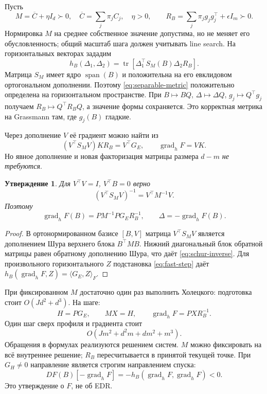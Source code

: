 \documentclass[11pt,a4paper]{article}
\newcommand{\tr}{\operatorname{tr}}
\newcommand{\spn}{\operatorname{span}}
\newcommand{\grad}{\operatorname{grad}}
\newcommand{\inner}[2]{\langle#1,#2\rangle_F}
\newtheorem{proposition}[theorem]{Утверждение}
\theoremstyle{remark}
\begin{document}
Пусть
\begin{equation}\label{eq:separable}
 M=\overline C+\eta I_d\succ0,\quad
 \overline C=\sum_j\pi_jC_j,\quad \eta>0,\qquad
 R_B=\sum_j\pi_jg_jg_j^\top+\epsilon I_m\succ0.
\end{equation}
Нормировка $M$ на среднее собственное значение допустима, но не меняет
его обусловленность; общий масштаб шага должен учитывать line search.
На горизонтальных векторах зададим
\begin{equation}\label{eq:separable-metric}
 h_B(\Delta_1,\Delta_2)
 =\tr[\Delta_1^\top S_M(B)\Delta_2R_B].
\end{equation}
Матрица $S_M$ имеет ядро $\spn(B)$ и положительна на его евклидовом
ортогональном дополнении. Поэтому \eqref{eq:separable-metric}
положительно определена на горизонтальном пространстве.
При $B\mapsto BQ$, $\Delta\mapsto\Delta Q$, $g_j\mapsto Q^\top g_j$
получаем $R_B\mapsto Q^\top R_BQ$, а значение формы сохраняется.
Это корректная метрика на Grassmann там, где $g_j(B)$ гладкие.

Через дополнение $V$ её градиент можно найти из
\[
 (V^\top S_MV)KR_B=V^\top G_E,\qquad \grad_hF=VK.
\]
Но явное дополнение и новая факторизация матрицы размера $d-m$
\emph{не требуются}.
\begin{proposition}\label{prop:inverse}
Для $V^\top V=I$, $V^\top B=0$ верно
\begin{equation}\label{eq:schur-inverse}
 (V^\top S_MV)^{-1}=V^\top M^{-1}V.
\end{equation}
Поэтому
\begin{equation}\label{eq:fast-step}
 \boxed{\displaystyle
 \grad_hF(B)=P M^{-1}P G_E R_B^{-1},\qquad
 \Delta=-\grad_hF(B).}
\end{equation}
\end{proposition}
\begin{proof}
В ортонормированном базисе $[B,V]$ матрица $V^\top S_MV$ является
дополнением Шура верхнего блока $B^\top MB$. Нижний диагональный блок
обратной матрицы равен обратному дополнению Шура, что даёт
\eqref{eq:schur-inverse}. Для произвольного горизонтального $Z$
подстановка \eqref{eq:fast-step} даёт
$h_B(\grad_hF,Z)=\inner{G_E}{Z}$.
\end{proof}

При фиксированном $M$ достаточно один раз выполнить Холецкого:
подготовка стоит $O(Jd^2+d^3)$. На шаге:
\[
 H=PG_E,\qquad MX=H,\qquad \grad_hF=PX R_B^{-1}.
\]
Один шаг сверх профиля и градиента стоит
\begin{equation}\label{eq:cost}
 O(Jm^2+d^2m+dm^2+m^3).
\end{equation}
Обращения в формулах реализуются решением систем.
$M$ можно фиксировать на всё внутреннее решение; $R_B$ пересчитывается
в принятой текущей точке. При $G_H\ne0$ направление является строгим
направлением спуска:
\[
 DF(B)[-\grad_hF]=-h_B(\grad_hF,\grad_hF)<0.
\]
Это утверждение о $F$, не об EDR.
\end{document}
